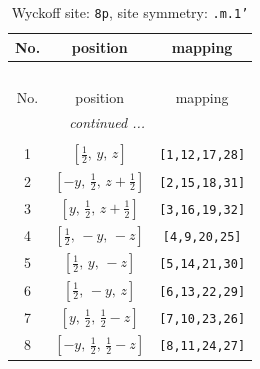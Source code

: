 \documentclass[fleqn,8pt]{jsarticle}
\begin{document}
\begin{longtable}{ccc}
\caption{Wyckoff site: {\tt 8p}, site symmetry: {\tt .m.1'}}
 \\
 \hline \hline
No. & position & mapping \\ \hline \endfirsthead

\multicolumn{2}{l}{\tablename\ \thetable{}} \\
 \hline \hline
No. & position & mapping \\ \hline \endhead

 \hline \hline
\multicolumn{2}{r}{\footnotesize\it continued ...} \\ \endfoot

 \hline \hline
\multicolumn{2}{r}{} \\ \endlastfoot

1 & $\left[ \frac{1}{2},\, y,\, z \right]$ & {\tt [1,12,17,28]} \\ \hline
2 & $\left[ - y,\, \frac{1}{2},\, z + \frac{1}{2} \right]$ & {\tt [2,15,18,31]} \\ \hline
3 & $\left[ y,\, \frac{1}{2},\, z + \frac{1}{2} \right]$ & {\tt [3,16,19,32]} \\ \hline
4 & $\left[ \frac{1}{2},\, - y,\, - z \right]$ & {\tt [4,9,20,25]} \\ \hline
5 & $\left[ \frac{1}{2},\, y,\, - z \right]$ & {\tt [5,14,21,30]} \\ \hline
6 & $\left[ \frac{1}{2},\, - y,\, z \right]$ & {\tt [6,13,22,29]} \\ \hline
7 & $\left[ y,\, \frac{1}{2},\, \frac{1}{2} - z \right]$ & {\tt [7,10,23,26]} \\ \hline
8 & $\left[ - y,\, \frac{1}{2},\, \frac{1}{2} - z \right]$ & {\tt [8,11,24,27]} \\
\end{longtable}
\renewcommand{\arraystretch}{1.2}
\end{document}
